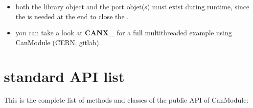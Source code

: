\documentclass[a4paper,10pt,english]{sphinxmanual}
\begin{document}
\begin{sphinxVerbatim}[commandchars=\\\{\}]
\end{sphinxVerbatim}
\begin{itemize}
\item {} 
\sphinxAtStartPar
both the library object  and the port objet(s)  must exist during runtime, since the 
is needed at the end to close the  .

\item {} 
\sphinxAtStartPar
you can take a look at {\color{red}\bfseries{}\textasciigrave{}CANX\textasciigrave{}\_} for a full multithreaded example using CanModule (CERN, gitlab).

\end{itemize}


\chapter{standard API list}
\label{\detokenize{standardApiList:standard-api-list}}\label{\detokenize{standardApiList::doc}}
\sphinxAtStartPar
This is the complete list of methods and classes of the public API of CanModule:
\end{document}

